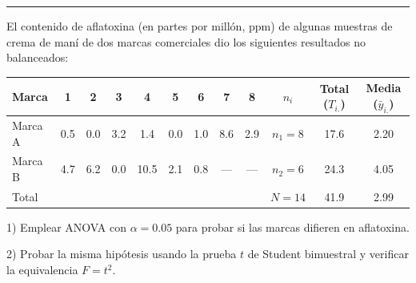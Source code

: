 \documentclass[10pt,a4paper]{article}
\begin{document}
\vspace{2pt}
\hrule
\vspace{4pt}

\begin{tcolorbox}[colback=blue!5, colframe=blue!45!black, title={\small\bfseries Enunciado del Problema}, boxsep=1pt, left=4pt, right=4pt, top=2pt, bottom=2pt]
{\small
El contenido de aflatoxina (en partes por millón, ppm) de algunas muestras de crema de maní de dos marcas comerciales dio los siguientes resultados no balanceados:

\vspace{2pt}
\begin{center}
\begin{tabular}{l c c c c c c c c | c c c}
\toprule
Marca & 1 & 2 & 3 & 4 & 5 & 6 & 7 & 8 & $n_i$ & Total ($T_{i.}$) & Media ($\bar{y}_{i.}$) \\
\midrule
Marca A & 0.5 & 0.0 & 3.2 & 1.4 & 0.0 & 1.0 & 8.6 & 2.9 & $n_1=8$ & 17.6 & 2.20 \\
Marca B & 4.7 & 6.2 & 0.0 & 10.5 & 2.1 & 0.8 & --- & --- & $n_2=6$ & 24.3 & 4.05 \\
\midrule
\multicolumn{9}{l}{Total} & $N=14$ & 41.9 & 2.99 \\
\bottomrule
\end{tabular}
\end{center}

1) Emplear ANOVA con $\alpha=0.05$ para probar si las marcas difieren en aflatoxina.

2) Probar la misma hipótesis usando la prueba $t$ de Student bimuestral y verificar la equivalencia $F=t^2$.
}
\end{tcolorbox}
\end{document}
